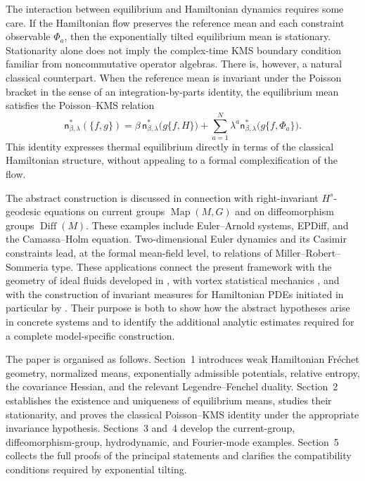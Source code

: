 \documentclass[11pt,reqno]{amsart}
\begin{document}
The interaction between equilibrium and Hamiltonian dynamics requires
some care. If the Hamiltonian flow preserves the reference mean and
each constraint observable $\Phi_a$, then the exponentially tilted
equilibrium mean is stationary. Stationarity alone does not imply the
complex-time KMS boundary condition familiar from noncommutative
operator algebras. There is, however, a natural classical counterpart.
When the reference mean is invariant under the Poisson bracket in the
sense of an integration-by-parts identity, the equilibrium mean
satisfies the Poisson--KMS relation
\[
\mathsf n_{\beta,\lambda}^*(\{f,g\})
=
\beta\,
\mathsf n_{\beta,\lambda}^*
\bigl(g\{f,H\}\bigr)
+
\sum_{a=1}^{N}\lambda^a
\mathsf n_{\beta,\lambda}^*
\bigl(g\{f,\Phi_a\}\bigr).
\]
This identity expresses thermal equilibrium directly in terms of the
classical Hamiltonian structure, without appealing to a formal
complexification of the flow.

The abstract construction is discussed in connection with
right-invariant $H^s$-geodesic equations on current groups
$\operatorname{Map}(M,G)$ and on diffeomorphism groups
$\operatorname{Diff}(M)$. These examples include Euler--Arnold systems,
EPDiff, and the Camassa--Holm equation. Two-dimensional Euler dynamics
and its Casimir constraints lead, at the formal mean-field level, to
relations of Miller--Robert--Sommeria type. These applications connect
the present framework with the geometry of ideal fluids developed in
\cite{EbinMarsden70}, with vortex statistical mechanics
\cite{MillerRobertSommeria91}, and with the construction of invariant
measures for Hamiltonian PDEs initiated in particular by
\cite{Bourgain94}. Their purpose is both to show how the abstract
hypotheses arise in concrete systems and to identify the additional
analytic estimates required for a complete model-specific
construction.

The paper is organised as follows. Section~1 introduces weak
Hamiltonian Fréchet geometry, normalized means, exponentially admissible
potentials, relative entropy, the covariance Hessian, and the relevant
Legendre--Fenchel duality. Section~2 establishes the existence and
uniqueness of equilibrium means, studies their stationarity, and proves
the classical Poisson--KMS identity under the appropriate invariance
hypothesis. Sections~3 and~4 develop the current-group,
diffeomorphism-group, hydrodynamic, and Fourier-mode examples.
Section~5 collects the full proofs of the principal statements and
clarifies the compatibility conditions required by exponential
tilting.
\end{document}
